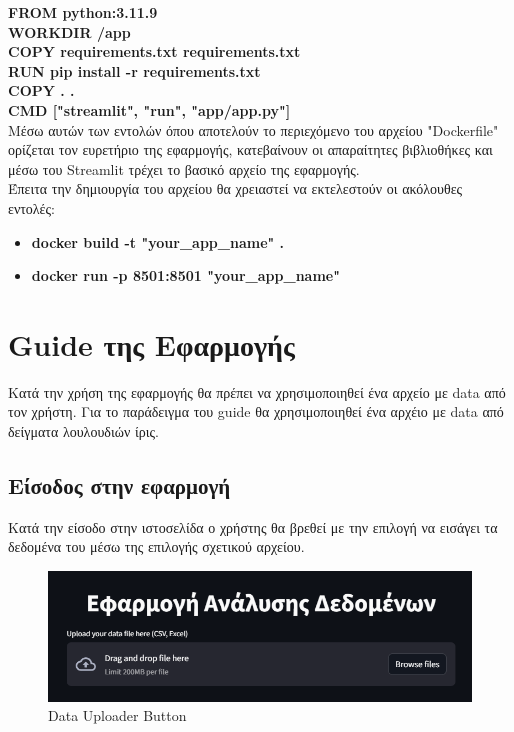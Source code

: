 \documentclass{article}
\begin{document}
\textbf{FROM python:3.11.9\\
WORKDIR /app\\
COPY requirements.txt requirements.txt\\
RUN pip install -r requirements.txt\\
COPY . .\\
CMD ["streamlit", "run", "app/app.py"]}\\
\vspace{0.3 cm}
Μέσω αυτών των εντολών όπου αποτελούν το περιεχόμενο του αρχείου "Dockerfile" ορίζεται τον ευρετήριο της εφαρμογής, κατεβαίνουν οι απαραίτητες βιβλιοθήκες και μέσω του Streamlit τρέχει το βασικό αρχείο της εφαρμογής.\\

Έπειτα την δημιουργία του αρχείου θα χρειαστεί να εκτελεστούν οι ακόλουθες εντολές:\\
\begin{itemize}
    \item \textbf{docker build -t "your\_app\_name" .}
    \item \textbf{docker run -p 8501:8501 "your\_app\_name"}
\end{itemize}

\newpage

\section{Guide της Εφαρμογής}
Κατά την χρήση της εφαρμογής θα πρέπει να χρησιμοποιηθεί ένα αρχείο με data από τον χρήστη. Για το παράδειγμα του guide θα χρησιμοποιηθεί ένα αρχέιο με data από δείγματα λουλουδιών ίρις.\\\vspace{0.3 cm}

\subsection{Είσοδος στην εφαρμογή}

Κατά την είσοδο στην ιστοσελίδα ο χρήστης θα βρεθεί με την επιλογή να εισάγει τα δεδομένα του μέσω της επιλογής σχετικού αρχείου.\\\vspace{0.3 cm}
\begin{figure}[h!]
  \centering
  \includegraphics[width=0.6\textheight]{photos/upload_button.png}
  \caption{Data Uploader Button}
  \label{fig:DataLoader}
\end{figure}
\end{document}
